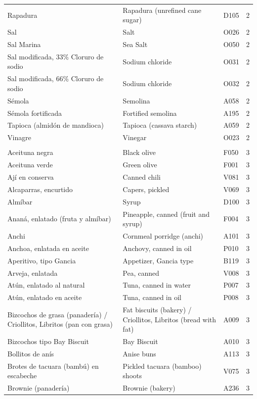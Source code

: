 {\begin{longtable}{p{4.3cm}p{5.5cm}p{1.5cm}p{0.7cm}}
Rapadura & Rapadura (unrefined cane sugar) & D105 & 2\\
Sal & Salt & O026 & 2\\
Sal Marina & Sea Salt & O050 & 2\\
Sal modificada, 33\% Cloruro de sodio & Sodium chloride & O031 & 2\\
Sal modificada, 66\% Cloruro de sodio & Sodium chloride & O032 & 2\\
Sémola & Semolina & A058 & 2\\
Sémola fortificada & Fortified semolina & A195 & 2\\
Tapioca (almidón de mandioca) & Tapioca (cassava starch) & A059 & 2\\
Vinagre & Vinegar & O023 & 2\\
\addlinespace
\multicolumn{4}{l}{\textbf{NOVA 3. Processed foods}}\\
Aceituna negra & Black olive & F050 & 3\\
Aceituna verde & Green olive & F001 & 3\\
Ají en conserva & Canned chili & V081 & 3\\
Alcaparras, encurtido & Capers, pickled & V069 & 3\\
Almíbar & Syrup & D100 & 3\\
Ananá, enlatado (fruta y almíbar) & Pineapple, canned (fruit and syrup) & F004 & 3\\
Anchi & Cornmeal porridge (anchi) & A101 & 3\\
Anchoa, enlatada en aceite & Anchovy, canned in oil & P010 & 3\\
Aperitivo, tipo Gancia & Appetizer, Gancia type & B119 & 3\\
Arveja, enlatada & Pea, canned & V008 & 3\\
Atún, enlatado al natural & Tuna, canned in water & P007 & 3\\
Atún, enlatado en aceite & Tuna, canned in oil & P008 & 3\\
Bizcochos de grasa (panadería) / Criollitos, Libritos (pan con grasa) & Fat biscuits (bakery) / Criollitos, Libritos (bread with fat) & A009 & 3\\
Bizcochos tipo Bay Biscuit & Bay Biscuit & A010 & 3\\
Bollitos de anís & Anise buns & A113 & 3\\
Brotes de tacuara (bambú) en escabeche & Pickled tacuara (bamboo) shoots & V075 & 3\\
Brownie (panadería) & Brownie (bakery) & A236 & 3\\

\end{longtable}}
